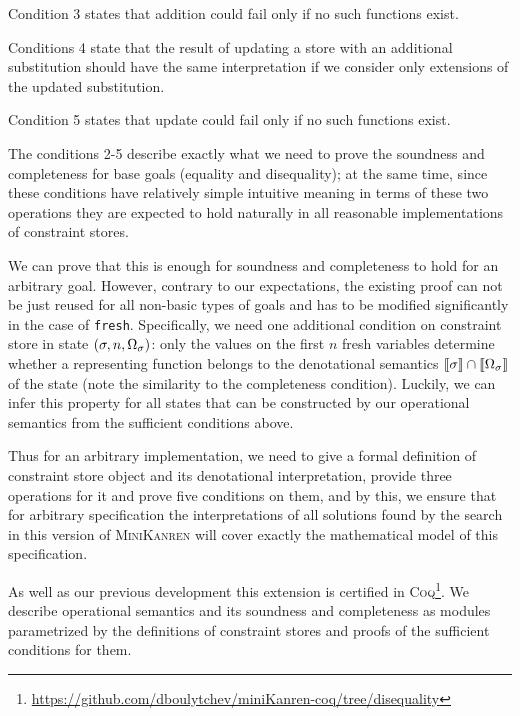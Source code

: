 Condition 3 states that addition could fail only if no such functions exist.

Conditions 4 state that the result of updating a store with an additional substitution should have the same interpretation if we consider only extensions of the updated substitution.

Condition 5 states that update could fail only if no such functions exist.

The conditions 2-5 describe exactly what we need to prove the soundness and completeness for base goals (equality and disequality); at the same time,
since these conditions have relatively simple intuitive meaning in terms of these two operations they are expected to hold naturally
in all reasonable implementations of constraint stores.

We can prove that this is enough for soundness and completeness to hold for an arbitrary goal. However,
contrary to our expectations, the existing proof can not be just reused for all non-basic types of goals and has to be modified
significantly in the case of \lstinline|fresh|. Specifically, we need one additional condition on constraint store in state $(\sigma, n, \Omega_\sigma)$:
only the values on the first $n$ fresh variables determine whether a representing function belongs to the denotational semantics $\llbracket{\sigma}\rrbracket \cap \llbracket{\Omega_\sigma}\rrbracket$
of the state (note the similarity to the completeness condition). Luckily, we can infer this property for all states that can be constructed by our operational
semantics from the sufficient conditions above.

Thus for an arbitrary implementation, we need to give a formal definition of constraint store object and its denotational interpretation, provide three
operations for it and prove five conditions on them, and by this, we ensure that for arbitrary specification the interpretations of all solutions found by the
search in this version of \textsc{MiniKanren} will cover exactly the mathematical model of this specification.

As well as our previous development this extension is certified in \textsc{Coq}\footnote{\url{https://github.com/dboulytchev/miniKanren-coq/tree/disequality}}.
We describe operational semantics and its soundness and completeness as modules parametrized by the definitions of constraint
stores and proofs of the sufficient conditions for them.
